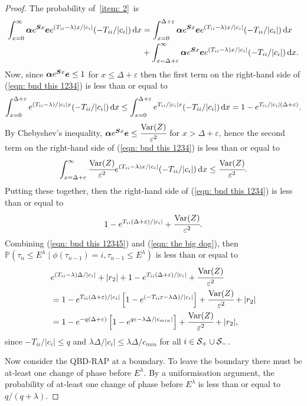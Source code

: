 \begin{proof}
	The probability of~\ref{item: 2}~is 
	\begin{align}
		\nonumber\int_{x=0}^\infty \boldsymbol \alpha e^{\boldsymbol{S}x}\boldsymbol e e^{(T_{ii}-\lambda)x/|c_i|}(-T_{ii}/|c_i|)\, \mathrm{d} x 
		&= \int_{x=0}^{\Delta+\varepsilon} \boldsymbol \alpha e^{\boldsymbol{S}x}\boldsymbol ee^{(T_{ii}-\lambda)x/|c_i|}(-T_{ii}/|c_i|)\, \mathrm{d} x 
		\\&{}+\int_{x=\Delta+\varepsilon}^\infty \boldsymbol \alpha e^{\boldsymbol{S}x}\boldsymbol e e^{(T_{ii}-\lambda)x/|c_i|}(-T_{ii}/|c_i|)\, \mathrm{d} x.\label{eqn: bnd this 1234}
	\end{align}
	Now, since \(\boldsymbol \alpha e^{\boldsymbol{S}x}\boldsymbol e\leq 1\) for \(x\leq \Delta+\varepsilon\) then the first term on the right-hand side of (\ref{eqn: bnd this 1234}) is less than or equal to 
	\[\displaystyle \int_{x=0}^{\Delta+\varepsilon} e^{(T_{ii}-\lambda)/|c_i|x}(-T_{ii}/|c_i|)\, \mathrm{d} x \leq \int_{x=0}^{\Delta+\varepsilon} e^{T_{ii}/|c_i|x}(-T_{ii}/|c_i|)\, \mathrm{d} x = 1-e^{T_{ii}/|c_i|(\Delta+\varepsilon)}.\]
	By Chebyshev's inequality, \(\boldsymbol \alpha e^{\boldsymbol{S}x}\boldsymbol e\leq \cfrac{\mathrm{Var}(Z)}{\varepsilon^2}\) for \(x> \Delta+\varepsilon\), hence the second term on the right-hand side of (\ref{eqn: bnd this 1234}) is less than or equal to 
	\[\displaystyle \int_{x=\Delta+\varepsilon}^\infty \cfrac{\mathrm{Var}(Z)}{\varepsilon^2} e^{(T_{ii}-\lambda)x/|c_i|}(-T_{ii}/|c_i|)\, \mathrm{d} x \leq  \cfrac{\mathrm{Var}(Z)}{\varepsilon^2}.\]
	Putting these together, then the right-hand side of (\ref{eqn: bnd this 1234}) is less than or equal to
	\begin{align}
		1-e^{T_{ii}(\Delta+\varepsilon)/|c_i|} + \cfrac{\mathrm{Var}(Z)}{\varepsilon^2}.\label{eqn: the big dog}
	\end{align}	
	Combining (\ref{eqn: bnd this 12345}) and (\ref{eqn: the big dog}), then \(\mathbb P(\tau_n\leq E^\lambda  \mid \phi(\tau_{n-1})=i , \tau_{n-1}\leq  E^\lambda)\) is less than or equal to 
	\begin{align}
		&e^{(T_{ii}-\lambda)\Delta/|c_i|} + |r_2| + 1-e^{T_{ii}(\Delta+\varepsilon)/|c_i|} + \cfrac{\mathrm{Var}(Z)}{\varepsilon^2}\nonumber
		\\&= 1-e^{T_{ii}(\Delta+\varepsilon)/|c_i|}\left[1-e^{(-T_{ii}\varepsilon-\lambda \Delta)/|c_i|}\right] + \cfrac{\mathrm{Var}(Z)}{\varepsilon^2} + |r_2| \nonumber 
		\\&= 1-e^{-q(\Delta+\varepsilon)}\left[1-e^{q\varepsilon-\lambda \Delta/|c_{min}|}\right] + \cfrac{\mathrm{Var}(Z)}{\varepsilon^2} + |r_2|,
	\end{align}
	since \(-T_{ii}/|c_i|\leq q\) and \(\lambda \Delta/|c_i| \leq \lambda \Delta/c_{min}\) for all \(i\in\mathcal S_+\cup \mathcal{S}_-\). 
	
	Now consider the QBD-RAP at a boundary. To leave the boundary there must be at-least one change of phase before \(E^\lambda\). By a uniformisation argument, the probability of at-least one change of phase before \(E^\lambda\) is less than or equal to \(q/(q+\lambda)\). 
\end{proof}

